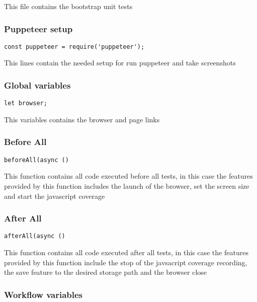 \documentclass[a4paper]{article}
\begin{document}
This file contains the bootstrap unit tests

\hypertarget{toc129}{}
\subsubsection{Puppeteer setup}

\begin{lstlisting}
const puppeteer = require('puppeteer');
\end{lstlisting}

This lines contain the needed setup for run puppeteer and take screenshots

\hypertarget{toc130}{}
\subsubsection{Global variables}

\begin{lstlisting}
let browser;
\end{lstlisting}

This variables contains the browser and page links

\hypertarget{toc131}{}
\subsubsection{Before All}

\begin{lstlisting}
beforeAll(async ()
\end{lstlisting}

This function contains all code executed before all tests, in this case the
features provided by this function includes the launch of the browser, set
the screen size and start the javascript coverage

\hypertarget{toc132}{}
\subsubsection{After All}

\begin{lstlisting}
afterAll(async ()
\end{lstlisting}

This function contains all code executed after all tests, in this case the
features provided by this function include the stop of the javsacript coverage
recording, the save feature to the desired storage path and the browser close

\hypertarget{toc133}{}
\subsubsection{Workflow variables}
\end{document}
